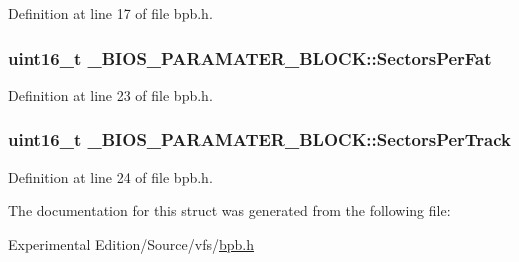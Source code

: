 Definition at line 17 of file bpb.\+h.

\subsubsection[{\texorpdfstring{Sectors\+Per\+Fat}{SectorsPerFat}}]{\setlength{\rightskip}{0pt plus 5cm}uint16\+\_\+t \+\_\+\+B\+I\+O\+S\+\_\+\+P\+A\+R\+A\+M\+A\+T\+E\+R\+\_\+\+B\+L\+O\+C\+K\+::\+Sectors\+Per\+Fat}\hypertarget{struct__BIOS__PARAMATER__BLOCK_adc667cf101250030eb318e36b38487ea}{}\label{struct__BIOS__PARAMATER__BLOCK_adc667cf101250030eb318e36b38487ea}


Definition at line 23 of file bpb.\+h.

\subsubsection[{\texorpdfstring{Sectors\+Per\+Track}{SectorsPerTrack}}]{\setlength{\rightskip}{0pt plus 5cm}uint16\+\_\+t \+\_\+\+B\+I\+O\+S\+\_\+\+P\+A\+R\+A\+M\+A\+T\+E\+R\+\_\+\+B\+L\+O\+C\+K\+::\+Sectors\+Per\+Track}\hypertarget{struct__BIOS__PARAMATER__BLOCK_a78ea312224353e262bc1c1af91f4ccde}{}\label{struct__BIOS__PARAMATER__BLOCK_a78ea312224353e262bc1c1af91f4ccde}


Definition at line 24 of file bpb.\+h.



The documentation for this struct was generated from the following file\+:\begin{DoxyCompactItemize}
\item 
Experimental Edition/\+Source/vfs/\hyperlink{bpb_8h}{bpb.\+h}\end{DoxyCompactItemize}
